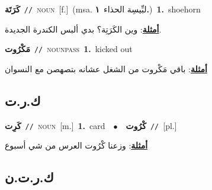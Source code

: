 \documentclass[10pt,a4paper,twoside]{article} %
\begin{document}
\begin{multicols}{2}
{\setlength\topsep{0pt}\textbf{\foreignlanguage{arabic}{كَرَتَة}}\ {\color{gray}\texttt{//}\color{black}}\ \textsc{noun}\ [f.]\ \color{gray}(msa. \foreignlanguage{arabic}{لبِّيسِة الحذاء}~\foreignlanguage{arabic}{\textbf{١.}})\color{black}\ \textbf{1.}~shoehorn\  \begin{flushright}\color{gray}\foreignlanguage{arabic}{\textbf{\underline{\foreignlanguage{arabic}{أمثلة}}}: وين الكَرَتِة؟ بدي ألبس الكندرة الجديدة.}\end{flushright}\color{black}} \vspace{2mm}

{\setlength\topsep{0pt}\textbf{\foreignlanguage{arabic}{مَكْرُوت}}\ {\color{gray}\texttt{//}\color{black}}\ \textsc{noun\textunderscore pass}\ \textbf{1.}~kicked out\  \begin{flushright}\color{gray}\foreignlanguage{arabic}{\textbf{\underline{\foreignlanguage{arabic}{أمثلة}}}: باقي مَكْروت من الشغل عشانه بتصهصن مع النسوان}\end{flushright}\color{black}} \vspace{2mm}

\vspace{-3mm}
\subsection*{\color{blue}\foreignlanguage{arabic}{ك.ر.ت}\color{blue}{ (ntws)}} 

{\setlength\topsep{0pt}\textbf{\foreignlanguage{arabic}{كَرِت}}\ {\color{gray}\texttt{//}\color{black}}\ \textsc{noun}\ [m.]\ \textbf{1.}~card\ \ $\bullet$\ \ \setlength\topsep{0pt}\textbf{\foreignlanguage{arabic}{كْرُوت}}\ {\color{gray}\texttt{//}\color{black}}\ [pl.]\  \begin{flushright}\color{gray}\foreignlanguage{arabic}{\textbf{\underline{\foreignlanguage{arabic}{أمثلة}}}: وزعنا كْرُوت العرس من شي أسبوع}\end{flushright}\color{black}} \vspace{2mm}

\vspace{-3mm}
\subsection*{\color{blue}\foreignlanguage{arabic}{ك.ر.ت.ن}\color{blue}{}} 


\end{multicols}
\end{document}
